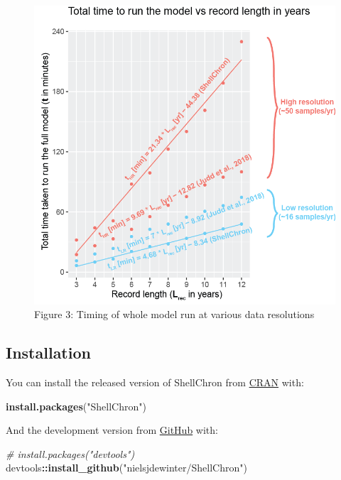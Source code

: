 \documentclass[
]{article}
\newenvironment{Shaded}{\begin{snugshade}}{\end{snugshade}}
\newcommand{\CommentTok}[1]{\textcolor[rgb]{0.56,0.35,0.01}{\textit{#1}}}
\newcommand{\KeywordTok}[1]{\textcolor[rgb]{0.13,0.29,0.53}{\textbf{#1}}}
\newcommand{\NormalTok}[1]{#1}
\newcommand{\OperatorTok}[1]{\textcolor[rgb]{0.81,0.36,0.00}{\textbf{#1}}}
\newcommand{\StringTok}[1]{\textcolor[rgb]{0.31,0.60,0.02}{#1}}
\begin{document}
\begin{figure}
\centering
\includegraphics{man/figures/README-Timing.png}
\caption{Figure 3: Timing of whole model run at various data
resolutions}
\end{figure}

\hypertarget{installation}{%
\subsection{Installation}\label{installation}}

You can install the released version of ShellChron from
\href{https://CRAN.R-project.org}{CRAN} with:

\begin{Shaded}
\begin{Highlighting}[]
\KeywordTok{install.packages}\NormalTok{(}\StringTok{"ShellChron"}\NormalTok{)}
\end{Highlighting}
\end{Shaded}

And the development version from \href{https://github.com/}{GitHub}
with:

\begin{Shaded}
\begin{Highlighting}[]
\CommentTok{# install.packages("devtools")}
\NormalTok{devtools}\OperatorTok{::}\KeywordTok{install_github}\NormalTok{(}\StringTok{"nielsjdewinter/ShellChron"}\NormalTok{)}
\end{Highlighting}
\end{Shaded}
\end{document}
